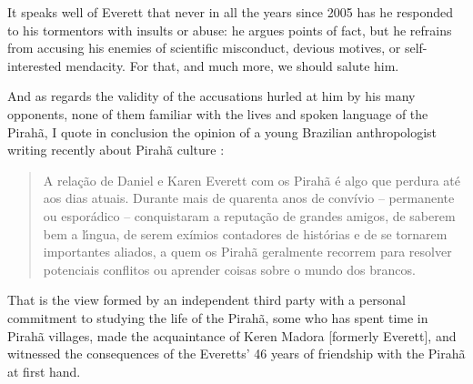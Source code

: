 \documentclass[output=paper,colorlinks,citecolor=brown
]{langscibook}
\begin{document}
It speaks well of Everett that never in all the years since 2005 has
he responded to his tormentors with insults or abuse: he argues points
of fact, but he refrains from accusing his enemies of scientific
misconduct, devious motives, or self-interested mendacity. For that,
and much more, we should salute him.

And as regards the validity of the accusations hurled at him by his
many opponents, none of them familiar with the lives and spoken
language of the Pirah{\~a}, I quote in conclusion the opinion of a
young Brazilian anthropologist writing recently about Pirah{\~a}
culture \citep{Felizes23}\addpages:
\begin{quote}
A rela{\c{c}}{\~a}o de Daniel e Karen Everett com os Pirah{\~a} {\'e}
algo que perdura at{\'e} aos dias atuais. Durante mais de quarenta
anos de convívio – permanente ou espor{\'a}dico – conquistaram a
reputa{\c{c}}{\~a}o de grandes amigos, de saberem bem a l{\'\i}ngua, de
serem exímios contadores de histórias e de se tornarem importantes
aliados, a quem os Pirah{\~a} geralmente recorrem para resolver
potenciais conflitos ou aprender coisas sobre o mundo dos brancos.

\end{quote}
That is the view formed by an independent third party with a personal
commitment to studying the life of the Pirah{\~a}, some who has spent time
in Pirah{\~a} villages, made the acquaintance of Keren Madora [formerly
Everett], and witnessed the consequences of the Everetts' 46 years of
friendship with the Pirah{\~a} at first hand.
\end{document}
